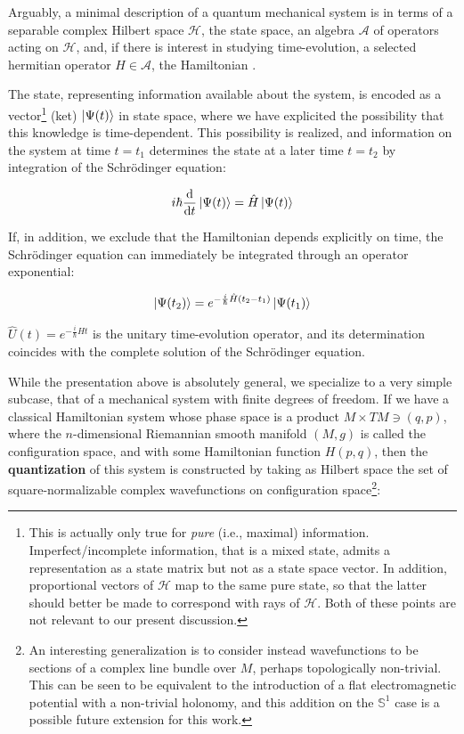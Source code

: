 \documentclass{article}
\newcommand{\hil}{\ensuremath{\mathcal{H}}}
\begin{document}
Arguably, a minimal description of a quantum mechanical system is in terms of a separable complex Hilbert space $\hil$, the state space, an algebra $\mathcal{A}$ of operators acting on $\hil$, and, if there is interest in studying time-evolution, a selected hermitian operator $H \in \mathcal{A}$, the Hamiltonian \cite{ali_quantization}.  

The state, representing information available about the system, is encoded as a vector\footnote{This is actually only true for \emph{pure} (i.e., maximal) information. Imperfect/incomplete information, that is a mixed state, admits a representation as a state matrix but not as a state space vector. In addition, proportional vectors of $\hil$ map to the same pure state, so that the latter should better be made to correspond with rays of $\hil$. Both of these points are not relevant to our present discussion.} (ket) $\ket{\Psi(t)}$ in state space, where we have explicited the possibility that this knowledge is time-dependent. This possibility is realized, and information on the system at time $t=t_1$ determines the state at a later time $t=t_2$ by integration of the Schr\"odinger equation:

\begin{equation*}
    i \hbar \dv{t}\ket{\Psi(t)} = \hat H \ket{\Psi(t)}
\end{equation*}


If, in addition, we exclude that the Hamiltonian depends explicitly on time, the Schr\"odinger equation can immediately be integrated through an operator exponential:

\begin{equation*}
    \ket{\Psi(t_2)} = e^{-\frac{i}{\hbar} \hat H (t_2-t_1)} \ket{\Psi(t_1)} 
\end{equation*}

$\hat U(t) = e^{-\frac{i}{\hbar} H t}$ is the unitary time-evolution operator, and its determination coincides with the complete solution of the Schr\"odinger equation.

While the presentation above is absolutely general, we specialize to a very simple subcase, that of a mechanical system with finite degrees of freedom. If we have a classical Hamiltonian system whose phase space is a product $M \times TM \ni (q,p)$, where the $n$-dimensional Riemannian smooth manifold $(M,g)$ is called the configuration space, and with some Hamiltonian function $H(p,q)$, then the \textbf{quantization} of this system is constructed by taking as Hilbert space the set of square-normalizable complex wavefunctions on configuration space\footnote{An interesting generalization is to consider instead wavefunctions to be sections of a complex line bundle over $M$, perhaps topologically non-trivial. This can be seen to be equivalent to the introduction of a flat electromagnetic potential with a non-trivial holonomy, and this addition on the $\mathbb{S}^1$ case is a possible future extension for this work.}:
\end{document}
